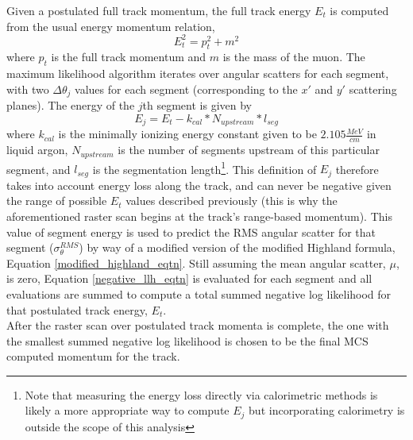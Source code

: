 Given a postulated full track momentum, the full track energy $E_t$ is computed from the usual energy momentum relation,
\begin{equation}\label{energy_momentum_relation_eqtn}
E_t^2 = p_t^2 + m^2
\end{equation}
 where $p_t$ is the full track momentum and $m$ is the mass of the muon. The maximum likelihood algorithm iterates over angular scatters for each segment, with two $\Delta\theta_j$ values for each segment (corresponding to the $x'$ and $y'$ scattering planes). The energy of the $j$th segment is given by
\begin{equation}\label{segment_E_equation}
E_{j} = E_t - k_{cal}*N_{upstream}*l_{seg}
\end{equation}
where $k_{cal}$ is the minimally ionizing energy constant given to be $2.105 \frac{MeV}{cm}$ in liquid argon\cite{MIPenergysource}, $N_{upstream}$ is the number of segments upstream of this particular segment, and $l_{seg}$ is the segmentation length\footnote{Note that measuring the energy loss directly via calorimetric methods is likely a more appropriate way to compute $E_j$ but incorporating calorimetry is outside the scope of this analysis}. This definition of $E_j$ therefore takes into account energy loss along the track, and can never be negative given the range of possible $E_t$ values described previously (this is why the aforementioned raster scan begins at the track's range-based momentum). This value of segment energy is used to predict the RMS angular scatter for that segment ($\sigma_\theta^{RMS}$) by way of a modified version of the modified Highland formula, Equation \ref{modified_highland_eqtn}. Still assuming the mean angular scatter, $\mu$, is zero, Equation \ref{negative_llh_eqtn} is evaluated for each segment and all evaluations are summed to compute a total summed negative log likelihood for that postulated track energy, $E_t$.\\

After the raster scan over postulated track momenta is complete, the one with the smallest summed negative log likelihood is chosen to be the final MCS computed momentum for the track.














